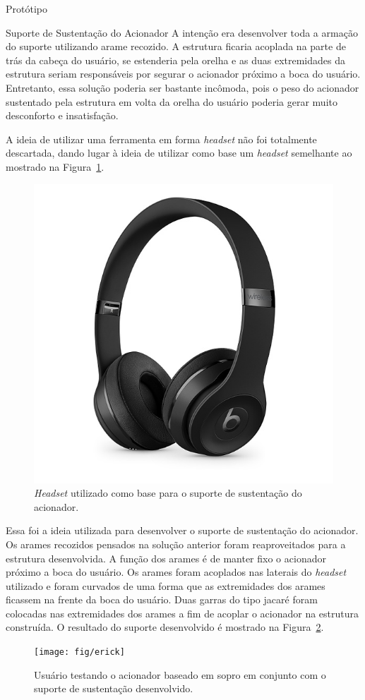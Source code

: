 \begin{chapter}{Protótipo}
\begin{section}{Suporte de Sustentação do Acionador}
A intenção era desenvolver toda a armação do suporte utilizando arame recozido.
A estrutura ficaria acoplada na parte de trás da cabeça do usuário, se estenderia
pela orelha e as duas extremidades da estrutura seriam responsáveis por segurar
o acionador próximo a boca do usuário. Entretanto, essa solução poderia ser
bastante incômoda, pois o peso do acionador sustentado pela estrutura em volta
da orelha do usuário poderia gerar muito desconforto e insatisfação.

A ideia de utilizar uma ferramenta em forma \textit{headset} não foi totalmente
descartada, dando lugar à ideia de utilizar como base um \textit{headset}
semelhante ao mostrado na Figura~\ref{fig:fone}. 
 
\begin{figure}[!h]
	\centering
	\begin{minipage}[c]{\textwidth}
	\centering
	\includegraphics[width=0.4\linewidth]{fig/fone}
	\caption{\textit{Headset} utilizado como base para o suporte de sustentação
do acionador.}
	\label{fig:fone}
	\end{minipage}
\end{figure}


Essa foi a ideia utilizada para desenvolver o suporte de sustentação do
acionador. Os arames recozidos pensados na solução anterior foram reaproveitados
para a estrutura desenvolvida. A função dos arames é de manter fixo o acionador
próximo a boca do usuário. Os arames foram acoplados nas laterais do
\textit{headset} utilizado e foram curvados de uma forma que as extremidades
dos arames ficassem na frente da boca do usuário. Duas garras do tipo jacaré
foram colocadas nas extremidades  dos arames a fim de acoplar o acionador na
estrutura construída. O resultado do suporte desenvolvido é mostrado na
Figura~\ref{fig:suporte}. 

\begin{figure}[!h]
	\centering
	\begin{minipage}[c]{\textwidth}
	\centering
	\texttt{[image: fig/erick]}
	\caption{Usuário testando o acionador baseado em sopro em conjunto com o
suporte de sustentação desenvolvido.} %
	\label{fig:suporte}
	\end{minipage}
\end{figure}


\end{section}
\end{chapter}
